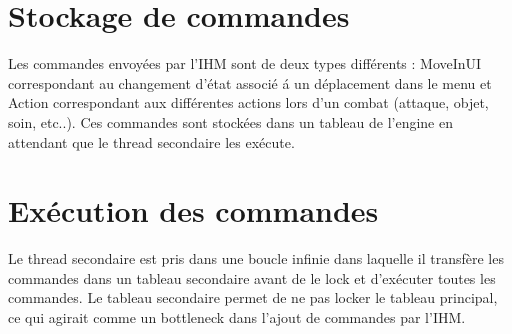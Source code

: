 \documentclass[12pt,a4paper]{report}
\begin{document}
\section{Stockage de commandes}

Les commandes envoy\'{e}es par l'IHM sont de deux types différents : MoveInUI correspondant au changement d'\'{e}tat associ\'{e} \'{a} un d\'{e}placement dans le menu et Action correspondant aux diff\'{e}rentes actions lors d'un combat (attaque, objet, soin, etc..). Ces commandes sont stock\'{e}es dans un tableau de l'engine en attendant que le thread secondaire les ex\'{e}cute.

\section{Ex\'{e}cution des commandes}

Le thread secondaire est pris dans une boucle infinie dans laquelle il transf\`{e}re les commandes dans un tableau secondaire avant de le lock et d'ex\'{e}cuter toutes les commandes. Le tableau secondaire permet de ne pas locker le tableau principal, ce qui agirait comme un bottleneck dans l'ajout de commandes par l'IHM.
\end{document}

